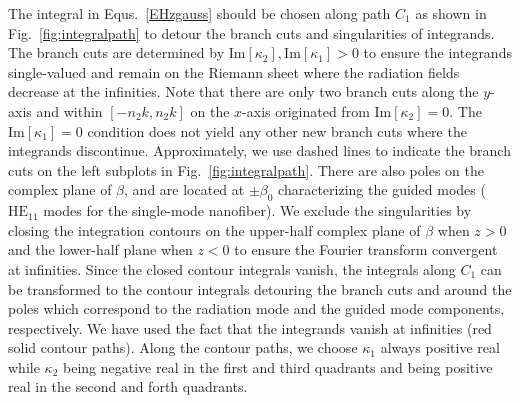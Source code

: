 \documentclass[preprint,aps,pra,onecolumn]{revtex4-1} %
\begin{document}
The integral in Equs.~\eqref{EHzgauss} should be chosen along path $C_1$ as shown in Fig.~\ref{fig:integralpath} to detour the branch cuts and singularities of integrands. The branch cuts are determined by $ \mathrm{Im}[\kappa_2],\mathrm{Im}[\kappa_1]>0 $ to ensure the integrands single-valued and remain on the Riemann sheet where the radiation fields decrease at the infinities. Note that there are only two branch cuts along the $ y $-axis and within $ [-n_2k,n_2k] $ on the $ x $-axis originated from $ \mathrm{Im}[\kappa_2]=0 $. The $ \mathrm{Im}[\kappa_1]=0 $ condition does not yield any other new branch cuts where the integrands discontinue. Approximately, we use dashed lines to indicate the branch cuts on the left subplots in Fig.~\ref{fig:integralpath}. There are also poles on the complex plane of $ \beta $, and are located at $ \pm\beta_0 $ characterizing the guided modes ($\mathrm{HE}_{11}$ modes for the single-mode nanofiber). We exclude the singularities by closing the integration contours on the upper-half complex plane of $ \beta $ when $ z>0 $ and the lower-half plane when $ z<0 $ to ensure the Fourier transform convergent at infinities. Since the closed contour integrals vanish, the integrals along $ C_1 $ can be transformed to the contour integrals detouring the branch cuts and around the poles which correspond to the radiation mode and the guided mode components, respectively. We have used the fact that the integrands vanish at infinities (red solid contour paths). Along the contour paths, we choose $ \kappa_1 $ always positive real while $ \kappa_2 $ being negative real in the first and third quadrants and being positive real in the second and forth quadrants. 
\end{document}
